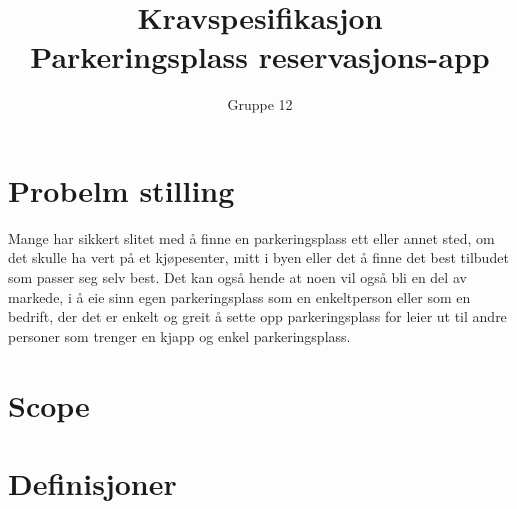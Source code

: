 \documentclass[12pt]{article}
\begin{document}
\title{%
    Kravspesifikasjon\\
    \large Parkeringsplass reservasjons-app }
\author{Gruppe 12}
\date{}
\maketitle

\newpage

\tableofcontents

\newpage

\section{Probelm stilling}
Mange har sikkert slitet med å finne en parkeringsplass ett eller annet sted, om det skulle ha vert på et kjøpesenter, mitt i byen eller det å finne det best tilbudet som passer seg selv best. Det kan også hende at noen vil også bli en del av markede, i å eie sinn egen parkeringsplass som en enkeltperson eller som en bedrift, der det er enkelt og greit å sette opp parkeringsplass for leier ut til andre personer som trenger en kjapp og enkel parkeringsplass. 

\section{Scope}

\section{Definisjoner}
\end{document}
